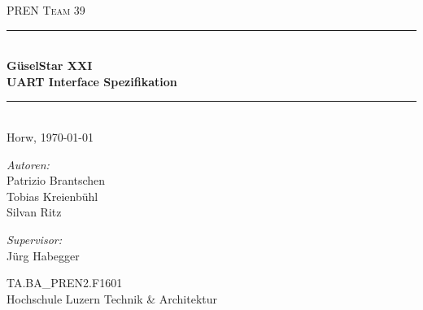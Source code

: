 \begin{titlepage}   

\begin{center}
\textsc{\Large PREN Team 39}\\[0.5cm]

\newcommand{\HRule}{\rule{\linewidth}{0.5mm}}
\HRule \\[0.4cm]
{ \huge \bfseries GüselStar XXI}\\[0.4cm]
{ \LARGE \bfseries UART Interface Spezifikation}\\[0.4cm]
\HRule \\[1.5cm]

{\large Horw, \today}

\begin{minipage}{0.4\textwidth}
\begin{flushleft} \large
\emph{Autoren:}\\
Patrizio Brantschen\\
Tobias Kreienbühl\\
Silvan Ritz
\end{flushleft}
\end{minipage}
\hfill
\begin{minipage}{0.4\textwidth}
\begin{flushright} \large
\emph{Supervisor:} \\
Jürg Habegger
\end{flushright}
\end{minipage}
\large
\vfill
TA.BA\_PREN2.F1601 \\
Hochschule Luzern Technik \& Architektur

\end{center}

\end{titlepage}